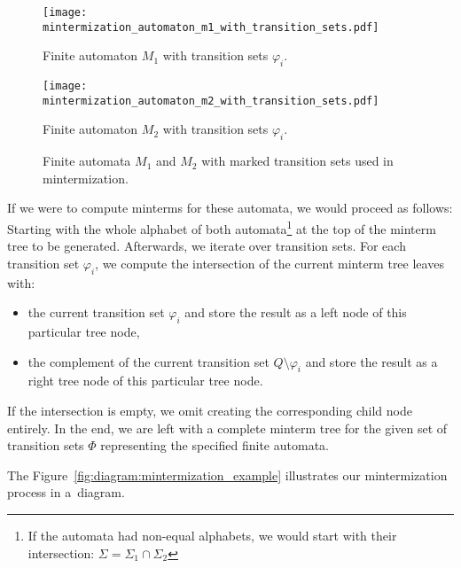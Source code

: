 \begin{figure*}[ht]
    \centering
    \begin{minipage}{0.49\linewidth}
        \centering
        \texttt{[image: mintermization\_automaton\_m1\_with\_transition\_sets.pdf]}
        \caption{Finite automaton $M_1$ with transition sets $\varphi_i$.}
        \label{fig:diagram:mintermization_automaton_m1_with_transition_sets}
    \end{minipage}
    \hfill
    \begin{minipage}{0.49\linewidth}
        \centering
        \texttt{[image: mintermization\_automaton\_m2\_with\_transition\_sets.pdf]}
        \caption{Finite automaton $M_2$ with transition sets $\varphi_i$.}
        \label{fig:diagram:mintermization_automaton_m2_with_transition_sets}
    \end{minipage}
    \vspace{0.5cm}
    \caption{Finite automata $M_1$ and $M_2$ with marked transition sets used in mintermization.}
    \label{fig:diagram:mintermization_automata_transition_sets}
\end{figure*}

If we were to compute minterms for these automata, we would proceed as follows: Starting with the whole alphabet of both automata\footnote{If the automata had non-equal alphabets, we would start with their intersection: $\Sigma = \Sigma_1 \cap \Sigma_2$} at the top of the minterm tree to be generated. Afterwards, we iterate over transition sets. For each transition set $\varphi_i$, we compute the intersection of the current minterm tree leaves with:
\begin{itemize}
    \item the current transition set $\varphi_i$ and store the result as a left node of this particular tree node,
    \item the complement of the current transition set $Q \setminus \varphi_i$ and store the result as a right tree node of this particular tree node.
\end{itemize}

If the intersection is empty, we omit creating the corresponding child node entirely. In the end, we are left with a complete minterm tree for the given set of transition sets $\Phi$ representing the specified finite automata.

The Figure~\ref{fig:diagram:mintermization_example} illustrates our mintermization process in a~diagram.

